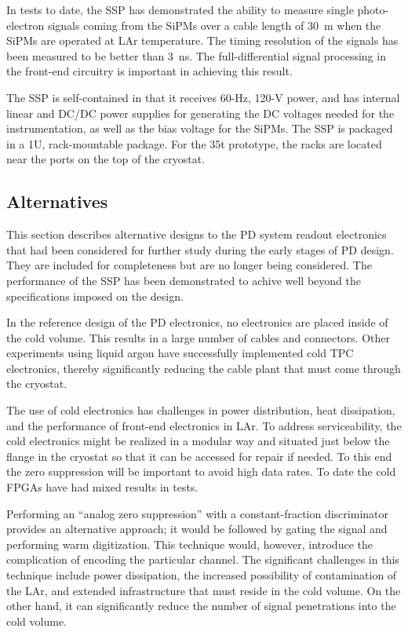 In tests to date, the SSP has demonstrated the ability to measure
single photo-electron signals coming from the SiPMs over a cable
length of 30~m when the SiPMs are operated at LAr temperature.  The
timing resolution of the signals has been measured to be better than
3~ns.  The full-differential signal processing in the front-end
circuitry is important in achieving this result.
 
The SSP is self-contained in that it receives 60-Hz, 120-V power, and
has internal linear and DC/DC power supplies for generating the DC
voltages needed for the instrumentation, as well as the bias voltage
for the SiPMs.  The SSP is packaged in a 1U, rack-mountable
package. For the 35t prototype, the racks are located near the ports
on the top of the cryostat.

\subsection{Alternatives}
\label{sec_alt}

This section describes alternative designs to the PD system readout
electronics that had been considered for further study during the
early stages of PD design. They are included for completeness but are
no longer being considered. The performance of the SSP has been
demonstrated to achive well beyond the specifications imposed on the
design. 


In the reference design of the PD electronics, no electronics are
placed inside of the cold volume.  This results in a large number of
cables and connectors.  Other experiments using liquid argon have
successfully implemented cold TPC electronics, thereby significantly
reducing the cable plant that must come through the cryostat.

The use of cold electronics has challenges in power distribution, heat
dissipation, and the performance of front-end electronics in LAr. To
address serviceability, the cold electronics might be realized in a
modular way and situated just below the flange in the cryostat so that
it can be accessed for repair if needed.  To this end the zero
suppression will be important to avoid high data rates. To date the
cold FPGAs have had mixed results in tests.


Performing an ``analog zero suppression'' with a constant-fraction
discriminator provides an alternative approach; it would be followed
by gating the signal and performing warm digitization. This technique
would, however, introduce the complication of encoding the particular
channel.
%
The significant challenges in this technique include power
dissipation, the increased possibility of contamination of the LAr,
and extended infrastructure that must reside in the cold volume.  On
the other hand, it can significantly reduce the number of signal
penetrations into the cold volume.

